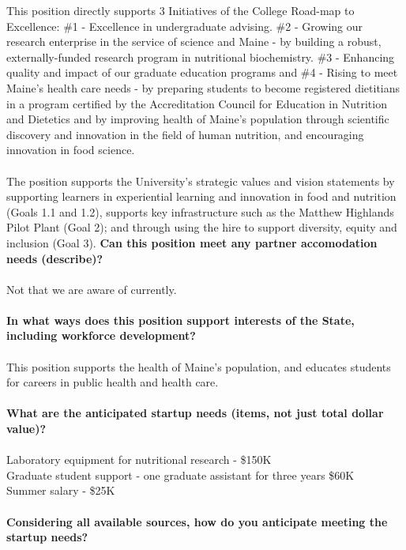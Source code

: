 \documentclass[11pt]{article}
\begin{document}
This position directly supports 3 Initiatives of the College Road-map to Excellence: \#1 - Excellence in undergraduate advising.
\#2 - Growing our research enterprise in the service of science and Maine - by building a robust, externally-funded research program in nutritional biochemistry. \#3 - Enhancing quality and impact of our graduate education programs and \#4 -  Rising to meet Maine's health care needs - by preparing students to become registered dietitians in a program certified by the Accreditation Council for Education in Nutrition and Dietetics and by improving health of Maine's population through scientific discovery and innovation in the field of human nutrition, and encouraging innovation in food science.  \\~\\The position supports the University's strategic values and vision statements by supporting learners in experiential learning and innovation in food and nutrition (Goals 1.1 and 1.2), supports key infrastructure such as the Matthew Highlands Pilot Plant (Goal 2); and through using the hire to support diversity, equity and inclusion (Goal 3).
\vfill
\noindent\textbf{\rmfamily Can this position meet any partner accomodation needs (describe)?}
\\~\\Not that we are aware of currently.\\~\\
\vfill
\noindent\textbf{\rmfamily In what ways does this position support interests of the State, including workforce development?}\\~\\
This position supports the health of Maine's population, and educates students for careers in public health and health care.
\\~\\
\vfill
\newpage\noindent\textbf{\rmfamily What are the anticipated startup needs (items, not just total dollar value)?}\\~\\
Laboratory equipment for nutritional research - \$150K \\
Graduate student support - one graduate assistant for three years \$60K\\
Summer salary - \$25K\\~\\
\vfill
\noindent\textbf{\rmfamily Considering all available sources, how do you anticipate meeting the startup needs?}\\~\\
\end{document}
